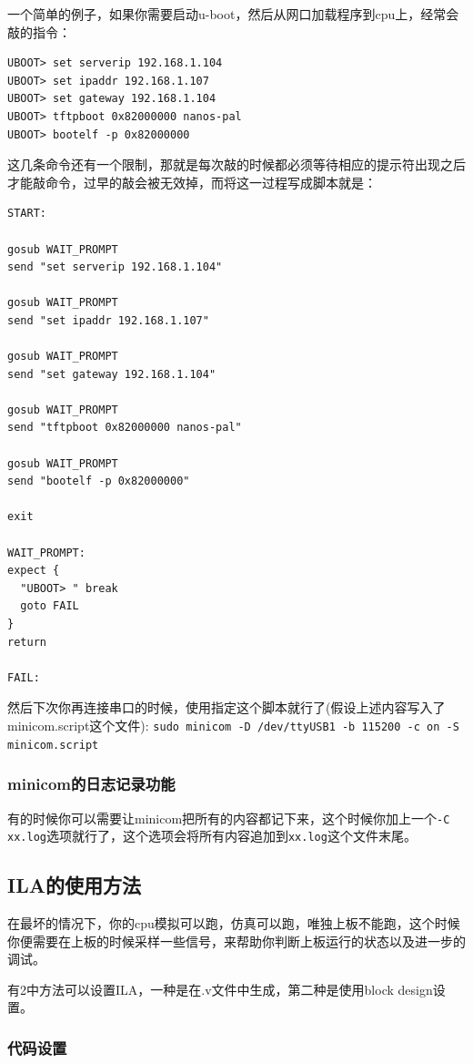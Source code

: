 \documentclass[lang=cn,11pt,a4paper]{elegantpaper}
\begin{document}
一个简单的例子，如果你需要启动u-boot，然后从网口加载程序到cpu上，经常会敲的指令：
\begin{lstlisting}
UBOOT> set serverip 192.168.1.104
UBOOT> set ipaddr 192.168.1.107
UBOOT> set gateway 192.168.1.104
UBOOT> tftpboot 0x82000000 nanos-pal
UBOOT> bootelf -p 0x82000000
\end{lstlisting}
这几条命令还有一个限制，那就是每次敲的时候都必须等待相应的提示符出现之后才能敲命令，过早的敲会被无效掉，而将这一过程写成脚本就是：
\begin{lstlisting}
START:

gosub WAIT_PROMPT
send "set serverip 192.168.1.104"

gosub WAIT_PROMPT
send "set ipaddr 192.168.1.107"

gosub WAIT_PROMPT
send "set gateway 192.168.1.104"

gosub WAIT_PROMPT
send "tftpboot 0x82000000 nanos-pal"

gosub WAIT_PROMPT
send "bootelf -p 0x82000000"

exit

WAIT_PROMPT:
expect {
  "UBOOT> " break
  goto FAIL
}
return

FAIL:
\end{lstlisting}
然后下次你再连接串口的时候，使用指定这个脚本就行了(假设上述内容写入了minicom.script这个文件): \lstinline!sudo minicom -D /dev/ttyUSB1 -b 115200 -c on -S minicom.script!

\subsubsection{minicom的日志记录功能}
有的时候你可以需要让minicom把所有的内容都记下来，这个时候你加上一个\lstinline!-C xx.log!选项就行了，这个选项会将所有内容追加到\lstinline!xx.log!这个文件末尾。

\subsection{ILA的使用方法}

在最坏的情况下，你的cpu模拟可以跑，仿真可以跑，唯独上板不能跑，这个时候你便需要在上板的时候采样一些信号，来帮助你判断上板运行的状态以及进一步的调试。

有2中方法可以设置ILA，一种是在.v文件中生成，第二种是使用block design设置。
\subsubsection{代码设置}
\end{document}
